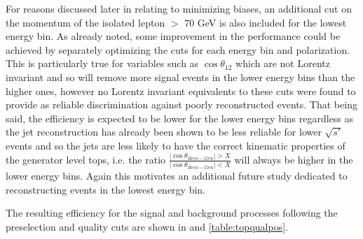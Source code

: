 For reasons discussed later in  relating to minimizing biases, an additional cut on the momentum of the isolated lepton $>$ 70 GeV is also included for the lowest energy bin. As already noted, some improvement in the performance could be achieved by separately optimizing the cuts for each energy bin and polarization. This is particularly true for variables such as $\cos\theta_{12}$ which are not Lorentz invariant and so will remove more signal events in the lower energy bins than the higher ones, however no Lorentz invariant equivalents to these cuts were found to provide as reliable discrimination against poorly reconstructed events. That being said, the efficiency is expected to be lower for the lower energy bins regardless as the jet reconstruction has already been shown to be less reliable for lower $\sqrt{s'}$ events and so the jets are less likely to have the correct kinematic properties of the generator level tops, i.e. the ratio  $\frac{|\cos\theta_{Reco-Gen}| > X}{|\cos\theta_{Reco-Gen}| < X}$ will always be higher in the lower energy bins. Again this motivates an additional future study dedicated to reconstructing events in the lowest energy bin.

The resulting efficiency for the signal and background processes following the preselection and quality cuts are shown in  and \ref{table:topqualpos}.

